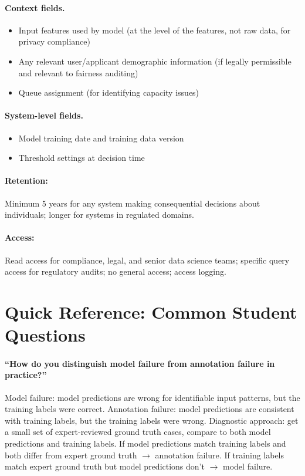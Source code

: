 \paragraph{Context fields.}
\begin{itemize}
    \item Input features used by model (at the level of the features, not raw data, for privacy compliance)
    \item Any relevant user/applicant demographic information (if legally permissible and relevant to fairness auditing)
    \item Queue assignment (for identifying capacity issues)
\end{itemize}

\paragraph{System-level fields.}
\begin{itemize}
    \item Model training date and training data version
    \item Threshold settings at decision time
\end{itemize}

\paragraph{Retention:} Minimum 5 years for any system making consequential decisions about individuals; longer for systems in regulated domains.

\paragraph{Access:} Read access for compliance, legal, and senior data science teams; specific query access for regulatory audits; no general access; access logging.

\section{Quick Reference: Common Student Questions}

\paragraph{``How do you distinguish model failure from annotation failure in practice?''}
Model failure: model predictions are wrong for identifiable input patterns, but the training labels were correct. Annotation failure: model predictions are consistent with training labels, but the training labels were wrong. Diagnostic approach: get a small set of expert-reviewed ground truth cases, compare to both model predictions and training labels. If model predictions match training labels and both differ from expert ground truth $\to$ annotation failure. If training labels match expert ground truth but model predictions don't $\to$ model failure.

